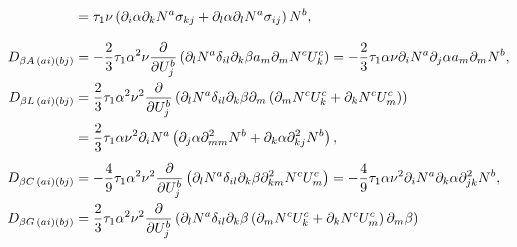 \begin{align}
                               & = \vphantom{\frac{\partial }{\partial U_j^b}} \tau_1 \nu \left( \partial_i \alpha \partial_k N^a \sigma_{kj} + \partial_l \alpha \partial_l N^a \sigma_{ij} \right) N^b, \label{eq:GBetaSigmaLHSStabilizationTerm}                                                                                                                                                                     \\
  D_{\beta A \, (ai)(bj)}      & = - \frac{2}{3} \tau_1 \alpha^2 \nu \frac{\partial }{\partial U_j^b} \left( \partial_l N^a \delta_{il} \partial_k \beta a_m \partial_m N^c U_k^c \right) = - \frac{2}{3} \tau_1 \alpha \nu \partial_i N^a \partial_j \alpha a_m \partial_m N^b, \label{eq:DBetaALHSStabilizationTerm}                                                                                                  \\
  D_{\beta L \, (ai)(bj)}      & = \frac{2}{3} \tau_1 \alpha^2 \nu^2 \frac{\partial }{\partial U_j^b} \left( \partial_l N^a \delta_{il} \partial_k \beta \partial_m \left( \partial_m N^c U_k^c +\partial_k N^c U_m^c \right) \right) \notag                                                                                                                                                                            \\
                               & = \vphantom{\frac{\partial }{\partial U_j^b}} \frac{2}{3} \tau_1 \alpha \nu^2 \partial_i N^a \left( \partial_j \alpha \partial_{mm}^2 N^b + \partial_k \alpha \partial_{kj}^2 N^b \right), \label{eq:DBetaLLHSStabilizationTerm}                                                                                                                                                       \\
  D_{\beta C \, (ai)(bj)}      & = - \frac{4}{9} \tau_1 \alpha^2 \nu^2 \frac{\partial }{\partial U_j^b} \left( \partial_l N^a \delta_{il} \partial_k \beta \partial_{km}^2 N^c U_m^c \right) = - \frac{4}{9} \tau_1 \alpha \nu^2 \partial_i N^a \partial_k \alpha \partial_{jk}^2 N^b, \label{eq:DBetaCLHSStabilizationTerm}                                                                                            \\
  D_{\beta G \, (ai)(bj)}      & = \frac{2}{3} \tau_1 \alpha^2 \nu^2 \frac{\partial }{\partial U_j^b} \left( \partial_l N^a \delta_{il} \partial_k \beta \left( \partial_m N^c U_k^c + \partial_k N^c U_m^c \right) \partial_m \beta \right) \notag                                                                                                                                                                     \\

\end{align}
